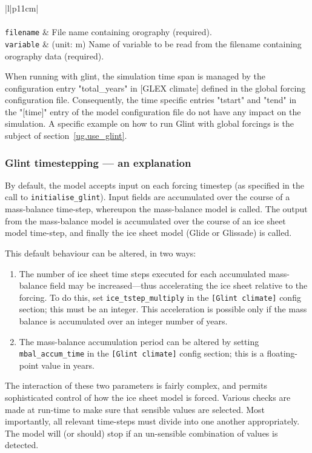 \begin{center}
\begin{supertabular}{|l|p{11cm}|}
    \hline
    \hline
    \\
    \hline
    \\
    \hline
    \texttt{filename} & File name containing orography (required).\\
    \texttt{variable} & (unit: m) Name of variable to be read from the filename containing orography data (required).\\
    \hline
     \end{supertabular}
\end{center}

%

When running with glint, the simulation time span is managed by the configuration entry "total\_years" in [GLEX climate] defined in the
global forcing configuration file. Consequently, the time specific entries "tstart" and "tend" in the "[time]" entry of the model configuration file 
do not have any impact on the simulation. A specific example on how to run Glint with global forcings is the subject of section~\ref{ug.use_glint}.



\subsubsection{Glint timestepping --- an explanation}

By default, the model accepts input on each forcing timestep (as specified in 
the call to \texttt{initialise\_glint}). Input fields are accumulated over the course 
of a mass-balance time-step, whereupon the mass-balance model is called. The 
output from the mass-balance model is accumulated over the course of an ice sheet
model time-step, and finally the ice sheet model (Glide or Glissade) is called.

This default behaviour can be altered, in two ways:
\begin{enumerate}
\item The number of ice sheet time steps executed for each accumulated 
mass-balance field may be increased---thus accelerating the ice sheet relative 
to the forcing. To do this, set \texttt{ice\_tstep\_multiply} in the \texttt{[Glint climate]} 
config section; this must be an integer. This acceleration is possible only if the 
mass balance is accumulated over an integer number of years.
\item The mass-balance accumulation period can be altered by setting  
\texttt{mbal\_accum\_time} in the \texttt{[Glint climate]} config section; this is a 
floating-point value in years.
\end{enumerate}
%
The interaction of these two parameters is fairly complex, and permits
sophisticated control of how the ice sheet model is forced. 
Various checks are made at run-time to make sure that sensible values are selected. Most 
importantly, all relevant time-steps must divide into one another 
appropriately. The model will (or should) stop if an un-sensible combination 
of values is detected.


